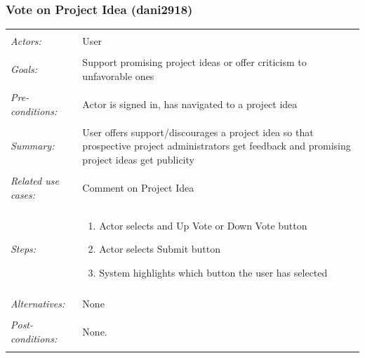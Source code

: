 \documentclass[11pt]{report}
\begin{document}
\subsubsection{Vote on Project Idea (dani2918)}
\begin{tabular}{ p{2cm} p{12cm} }
 \hline
 \\
 \textit{Actors:} & User \\ 
 \\
 \textit{Goals:} & Support promising project ideas or offer criticism to unfavorable ones  \\
 \\
 \textit{Pre-conditions:} & Actor is signed in, has navigated to a project idea  \\
 \\
 \textit{Summary:} &  User offers support/discourages a project idea so that prospective project administrators get feedback and promising project ideas get publicity \\ 
 \\
 \textit{Related use cases:} & Comment on Project Idea \\ 
 \\
 \textit{Steps:} & \begin{enumerate}
  \item Actor selects and Up Vote or Down Vote button
  \item Actor selects Submit button 
  \item System highlights which button the user has selected
 \end{enumerate} \\
 \\
 \textit{Alternatives:} & None \\
 \\
 \textit{Post-conditions:} & None. \\
 \\
\hline
\end{tabular}
\end{document}
